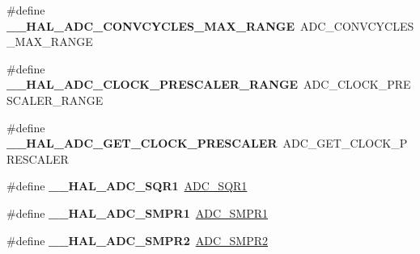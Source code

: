 \begin{DoxyCompactItemize}
\item 
\#define {\bfseries \+\_\+\+\_\+\+H\+A\+L\+\_\+\+A\+D\+C\+\_\+\+C\+O\+N\+V\+C\+Y\+C\+L\+E\+S\+\_\+\+M\+A\+X\+\_\+\+R\+A\+N\+GE}~A\+D\+C\+\_\+\+C\+O\+N\+V\+C\+Y\+C\+L\+E\+S\+\_\+\+M\+A\+X\+\_\+\+R\+A\+N\+GE\hypertarget{group___h_a_l___a_d_c___aliased___macros_gaffcdf78845300c37812650611d2915b4}{}\label{group___h_a_l___a_d_c___aliased___macros_gaffcdf78845300c37812650611d2915b4}

\item 
\#define {\bfseries \+\_\+\+\_\+\+H\+A\+L\+\_\+\+A\+D\+C\+\_\+\+C\+L\+O\+C\+K\+\_\+\+P\+R\+E\+S\+C\+A\+L\+E\+R\+\_\+\+R\+A\+N\+GE}~A\+D\+C\+\_\+\+C\+L\+O\+C\+K\+\_\+\+P\+R\+E\+S\+C\+A\+L\+E\+R\+\_\+\+R\+A\+N\+GE\hypertarget{group___h_a_l___a_d_c___aliased___macros_gad371b9c9ce847537972a0bc6c1422c45}{}\label{group___h_a_l___a_d_c___aliased___macros_gad371b9c9ce847537972a0bc6c1422c45}

\item 
\#define {\bfseries \+\_\+\+\_\+\+H\+A\+L\+\_\+\+A\+D\+C\+\_\+\+G\+E\+T\+\_\+\+C\+L\+O\+C\+K\+\_\+\+P\+R\+E\+S\+C\+A\+L\+ER}~A\+D\+C\+\_\+\+G\+E\+T\+\_\+\+C\+L\+O\+C\+K\+\_\+\+P\+R\+E\+S\+C\+A\+L\+ER\hypertarget{group___h_a_l___a_d_c___aliased___macros_ga0595fba00a50ea5ba7b8baf4cbdd6820}{}\label{group___h_a_l___a_d_c___aliased___macros_ga0595fba00a50ea5ba7b8baf4cbdd6820}

\item 
\#define {\bfseries \+\_\+\+\_\+\+H\+A\+L\+\_\+\+A\+D\+C\+\_\+\+S\+Q\+R1}~\hyperlink{group___a_d_c___private___macros_ga1958741688a480069df9ab5e15be93ca}{A\+D\+C\+\_\+\+S\+Q\+R1}\hypertarget{group___h_a_l___a_d_c___aliased___macros_ga7355b4d9c49af127fdb5a1dd7e8b66f0}{}\label{group___h_a_l___a_d_c___aliased___macros_ga7355b4d9c49af127fdb5a1dd7e8b66f0}

\item 
\#define {\bfseries \+\_\+\+\_\+\+H\+A\+L\+\_\+\+A\+D\+C\+\_\+\+S\+M\+P\+R1}~\hyperlink{group___a_d_c___private___macros_ga29f7414128fbbdb81db6ea6ede449f4b}{A\+D\+C\+\_\+\+S\+M\+P\+R1}\hypertarget{group___h_a_l___a_d_c___aliased___macros_gad8e081521ef7ee963c7833376f52dbfd}{}\label{group___h_a_l___a_d_c___aliased___macros_gad8e081521ef7ee963c7833376f52dbfd}

\item 
\#define {\bfseries \+\_\+\+\_\+\+H\+A\+L\+\_\+\+A\+D\+C\+\_\+\+S\+M\+P\+R2}~\hyperlink{group___a_d_c___private___macros_gaeb66714538d978d4d336a4a6ef0d58bc}{A\+D\+C\+\_\+\+S\+M\+P\+R2}\hypertarget{group___h_a_l___a_d_c___aliased___macros_gabd50880ede02b19440d1dbc549b19e8f}{}\label{group___h_a_l___a_d_c___aliased___macros_gabd50880ede02b19440d1dbc549b19e8f}


\end{DoxyCompactItemize}
